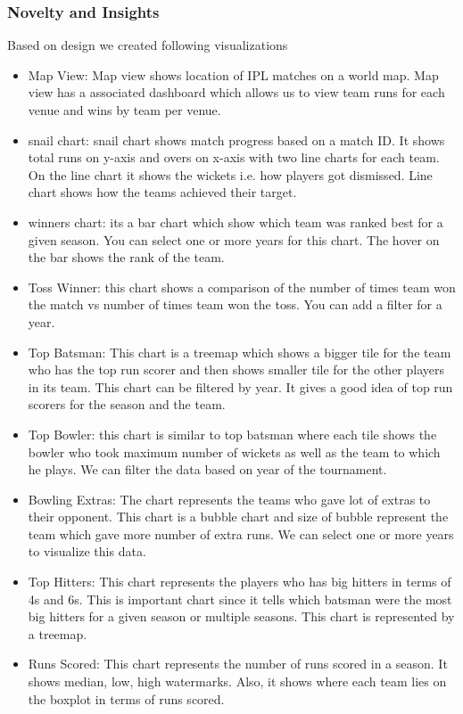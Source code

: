 \documentclass[sigconf]{acmart}
\begin{document}
\subsubsection{Novelty and Insights}
Based on design we created following visualizations
\begin{itemize}
\item Map View: Map view shows location of IPL matches on a world map. Map view has
a associated dashboard which allows us to view team runs for each venue and wins by team 
per venue.
\item snail chart: snail chart shows match progress based on a match ID. It shows total runs on 
y-axis and overs on x-axis with two line charts for each team. On the line chart it shows the
wickets i.e. how players got dismissed. Line chart shows how the teams achieved their target.
\item winners chart: its a bar chart which show which team was ranked best for a given season.
You can select one or more years for this chart. The hover on the bar shows the rank of the team.
\item Toss Winner: this chart shows a comparison of the number of times team won the match vs 
number of times team won the toss. You can add a filter for a year.
\item Top Batsman: This chart is a treemap which shows a bigger tile for the team who has the 
top run scorer and then shows smaller tile for the other players in its team. This chart can be 
filtered by year. It gives a good idea of top run scorers for the season and the team.
\item Top Bowler: this chart is similar to top batsman where each tile shows the bowler
who took maximum number of wickets as well as the team to which he plays. We can filter
the data based on year of the tournament.
\item Bowling Extras: The chart represents the teams who gave lot of extras to their opponent.
This chart is a bubble chart and size of bubble represent the team which gave more number of 
extra runs. We can select one or more years to visualize this data.
\item Top Hitters: This chart represents the players who has big hitters in terms of 4s and 6s.
This is important chart since it tells which batsman were the most big hitters for a given season 
or multiple seasons. This chart is represented by a treemap.
\item Runs Scored: This chart represents the number of runs scored in a season. It shows median,
low, high watermarks. Also, it shows where each team lies  on the boxplot in terms of runs scored.

\end{itemize}
\end{document}
